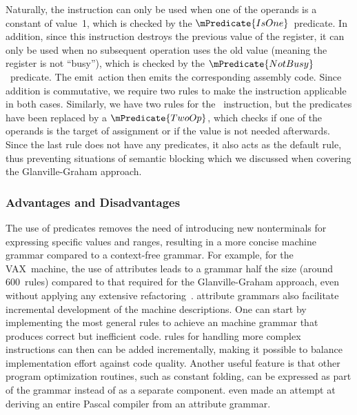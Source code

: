 %
Naturally, the  \gls{instruction} can only be used when one of the
operands is a constant of value~\num{1}, which is checked by the
$\mPredicate{IsOne}$~\gls{predicate}.
%
In addition, since this \gls{instruction} destroys the previous value of the
\gls{register}, it can only be used when no subsequent operation uses the old
value (meaning the \gls{register} is not ``busy''), which is checked by the
$\mPredicate{NotBusy}$~\gls{predicate}.
%
The emit~\gls{action} then emits the corresponding \gls{assembly code}.
%
Since addition is commutative, we require two \glspl{rule} to make the
\gls{instruction} applicable in both cases.
%
Similarly, we have two \glspl{rule} for the ~\gls{instruction},
but the \glspl{predicate} have been replaced by a $\mPredicate{TwoOp}$, which
checks if one of the operands is the target of assignment or if the value is not
needed afterwards.
%
Since the last \gls{rule} does not have any \glspl{predicate}, it also acts as
the default \gls{rule}, thus preventing situations of \gls{semantic blocking}
which we discussed when covering the \gls{Glanville-Graham approach}.


\subsubsection{Advantages and Disadvantages}

The use of \glspl{predicate} removes the need of introducing new
\glspl{nonterminal} for expressing specific values and ranges, resulting in a
more concise \gls{machine grammar} compared to a \gls{context-free grammar}.
%
For example, for the \gls{VAX}~machine, the use of \glspl{attribute} leads to a
\gls{grammar} half the size (around \num{600}~\glspl{rule}) compared to that
required for the \gls{Glanville-Graham approach}, even without applying any
extensive \gls{refactoring}~\cite{GanapathiFischer:1985}.
%
\Glspl{attribute grammar} also facilitate incremental development of the
\glspl{machine description}.
%
One can start by implementing the most general \glspl{rule} to achieve an
\gls{machine grammar} that produces correct but inefficient code.
%
\Glspl{rule} for handling more complex \glspl{instruction} can then can be added
incrementally, making it possible to balance implementation effort against code
quality.
%
Another useful feature is that other \gls{program} optimization routines, such
as \gls{constant folding}, can be expressed as part of the \gls{grammar} instead
of as a separate component.
%
\textcite{Farrow:1982} even made an attempt at deriving an entire \gls{Pascal}
\gls{compiler} from an \gls{attribute grammar}.

